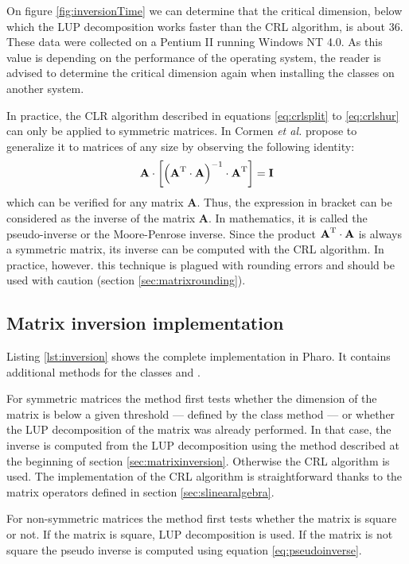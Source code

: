On figure \ref{fig:inversionTime} we can determine that the
critical dimension, below which the LUP decomposition works faster
than the CRL algorithm, is about $36$. These data were collected on
a Pentium II running Windows NT 4.0. As this value is depending on
the performance of the operating system, the reader is advised to
determine the critical dimension again when installing the classes
on another system.

In practice, the CLR algorithm described in equations
\ref{eq:crlsplit} to \ref{eq:crlshur} can only be applied to
symmetric matrices. In \cite{CorLeiRiv} Cormen \textit{et al.}
propose to generalize it to matrices of any size by observing the
following identity:
\begin{equation}
\label{eq:pseudoinverse}
  \textbf{A}\cdot\left[\left(\textbf{A}^{\mathop\textrm{T}}\cdot\textbf{A}\right)^{-1}\cdot\textbf{A}^{\mathop\textrm{T}}\right]=\textbf{I}
\end{equation}
which can be verified for any matrix $\textbf{A}$. Thus, the
expression in bracket can be considered as the inverse of the
matrix $\textbf{A}$. In mathematics, it is called the pseudo-inverse
or the Moore-Penrose inverse. Since the product
$\textbf{A}^{\mathop\textrm{T}}\cdot\textbf{A}$ is always a symmetric matrix, its
inverse can be computed with the CRL algorithm. In practice,
however. this technique is plagued with rounding errors and should
be used with caution (\cf section \ref{sec:matrixrounding}).

\subsection{Matrix inversion implementation}
Listing \ref{lst:inversion} shows the complete implementation in
Pharo. It contains additional methods for the classes  and .

For symmetric matrices the method  first tests
whether the dimension of the matrix is below a given threshold ---
defined by the class method  --- or
whether the LUP decomposition of the matrix was already performed.
In that case, the inverse is computed from the LUP decomposition
using the method described at the beginning of section
\ref{sec:matrixinversion}. Otherwise the CRL algorithm is used.
The implementation of the CRL algorithm is straightforward thanks
to the matrix operators defined in section
\ref{sec:slinearalgebra}.

For non-symmetric matrices the method  first tests
whether the matrix is square or not. If the matrix is square, LUP
decomposition is used. If the matrix is not square the pseudo
inverse is computed using equation \ref{eq:pseudoinverse}.


